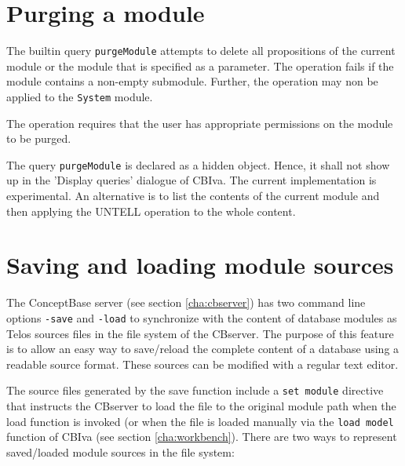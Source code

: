 \section{Purging a module} \label{sec:module_purge}

The builtin query {\tt purgeModule} attempts to delete all propositions
of the current module or the module that is specified as a parameter.
The operation fails if the module contains a non-empty submodule. 
Further, the operation may non be applied to the {\tt System} module.

The operation requires that the user has appropriate permissions on the module
to be purged. 

The query {\tt purgeModule} is declared as a hidden object. Hence, it shall not show
up in the 'Display queries' dialogue of CBIva. The current implementation is experimental.
An alternative is to list the contents of the current module and then
applying the UNTELL operation to the whole content.





\section{Saving and loading module sources} \label{sec:module_sources}

The ConceptBase server (see section \ref{cha:cbserver}) has two command line
options {\tt -save} and {\tt -load} to synchronize with the content of database modules as
Telos sources files in the file system of the CBserver. The purpose
of this feature is to allow an easy way to save/reload the complete content
of a database using a readable source format. These sources can be modified
with a regular text editor. 

The source files generated by the save function include a {\tt set module}
directive that instructs the CBserver to load the file to the original
module path when the load function is invoked (or when the file is loaded
manually via the {\tt load model} function of CBIva (see section \ref{cha:workbench}).
There are two ways to represent saved/loaded module sources in the file system:

